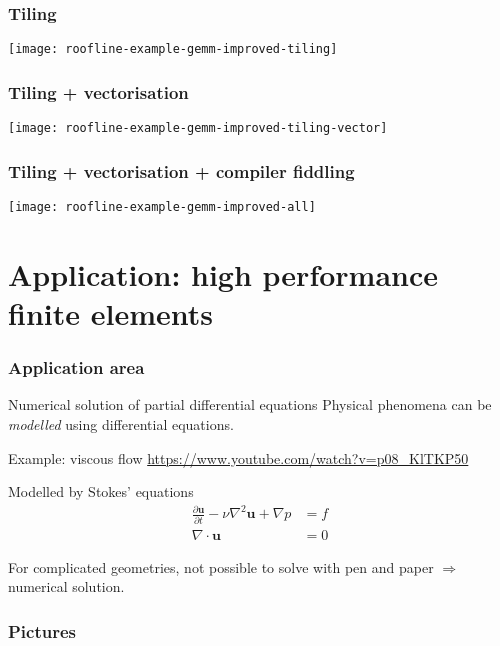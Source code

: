 \documentclass[presentation,aspectratio=43,10pt]{beamer}
\begin{document}
\begin{frame}
  \frametitle{Tiling}
  \begin{center}
    \texttt{[image: roofline-example-gemm-improved-tiling]}
  \end{center}
\end{frame}
\begin{frame}
  \frametitle{Tiling + vectorisation}
  \begin{center}
    \texttt{[image: roofline-example-gemm-improved-tiling-vector]}
  \end{center}
\end{frame}
\begin{frame}
  \frametitle{Tiling + vectorisation + compiler fiddling}
  \begin{center}
    \texttt{[image: roofline-example-gemm-improved-all]}
  \end{center}
\end{frame}


\section{Application: high performance finite elements}
\begin{frame}
  \frametitle{Application area}

  \begin{exampleblock}{Numerical solution of partial differential equations}
    Physical phenomena can be \emph{modelled} using differential
    equations.

    Example: viscous flow
    \url{https://www.youtube.com/watch?v=p08_KlTKP50}

    Modelled by Stokes' equations
    \begin{align*}
      \frac{\partial \mathbf{u}}{\partial t} -\nu \nabla^2 \mathbf{u} + \nabla p &= f\\
      \nabla \cdot \mathbf{u} &= 0
    \end{align*}

    For complicated geometries, not possible to solve with pen and
    paper $\Rightarrow$ numerical solution.
  \end{exampleblock}
\end{frame}

\begin{frame}
  \frametitle{Pictures}

  \begin{center}
  \end{center}
\end{frame}
\end{document}

